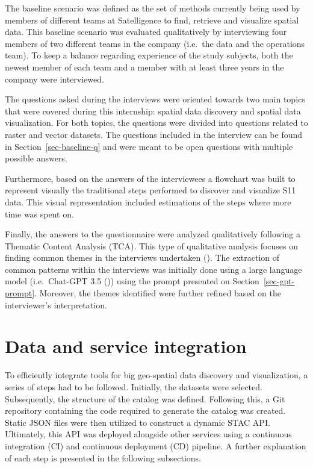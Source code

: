 \documentclass[
  oneside,
  open=any]{scrbook}
\begin{document}
The baseline scenario was defined as the set of methods currently being
used by members of different teams at Satelligence to find, retrieve and
visualize spatial data. This baseline scenario was evaluated
qualitatively by interviewing four members of two different teams in the
company (i.e.~the data and the operations team). To keep a balance
regarding experience of the study subjects, both the newest member of
each team and a member with at least three years in the company were
interviewed.

The questions asked during the interviews were oriented towards two main
topics that were covered during this internship: spatial data discovery
and spatial data visualization. For both topics, the questions were
divided into questions related to raster and vector datasets. The
questions included in the interview can be found in
Section~\ref{sec-baseline-q} and were meant to be open questions with
multiple possible answers.

Furthermore, based on the answers of the interviewees a flowchart was
built to represent visually the traditional steps performed to discover
and visualize S11 data. This visual representation included estimations
of the steps where more time was spent on.

Finally, the answers to the questionnaire were analyzed qualitatively
following a Thematic Content Analysis (TCA). This type of qualitative
analysis focuses on finding common themes in the interviews undertaken
(). The extraction
of common patterns within the interviews was initially done using a
large language model (i.e.~Chat-GPT 3.5
()) using the prompt
presented on Section~\ref{sec-gpt-prompt}. Moreover, the themes
identified were further refined based on the interviewer's
interpretation.

\section{Data and service
integration}\label{data-and-service-integration}

To efficiently integrate tools for big geo-spatial data discovery and
visualization, a series of steps had to be followed. Initially, the
datasets were selected. Subsequently, the structure of the catalog was
defined. Following this, a Git repository containing the code required
to generate the catalog was created. Static JSON files were then
utilized to construct a dynamic STAC API. Ultimately, this API was
deployed alongside other services using a continuous integration (CI)
and continuous deployment (CD) pipeline. A further explanation of each
step is presented in the following subsections.
\end{document}
